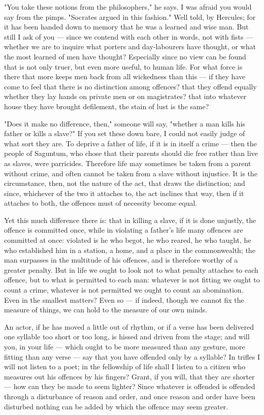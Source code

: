  "You take these notions from the philosophers," he says. I was afraid you would say from the pimps. "Socrates argued in this fashion." Well told, by Hercules; for it has been handed down to memory that he was a learned and wise man. But still I ask of you — since we contend with each other in words, not with fists — whether we are to inquire what porters and day-labourers have thought, or what the most learned of men have thought? Especially since no view can be found that is not only truer, but even more useful, to human life. For what force is there that more keeps men back from all wickedness than this — if they have come to feel that there is no distinction among offences? that they offend equally whether they lay hands on private men or on magistrates? that into whatever house they have brought defilement, the stain of lust is the same?

 "Does it make no difference, then," someone will say, "whether a man kills his father or kills a slave?" If you set these down bare, I could not easily judge of what sort they are. To deprive a father of life, if it is in itself a crime — then the people of Saguntum, who chose that their parents should die free rather than live as slaves, were parricides. Therefore life may sometimes be taken from a parent without crime, and often cannot be taken from a slave without injustice. It is the circumstance, then, not the nature of the act, that draws the distinction; and since, whichever of the two it attaches to, the act inclines that way, then if it attaches to both, the offences must of necessity become equal.

 Yet this much difference there is: that in killing a slave, if it is done unjustly, the offence is committed once, while in violating a father's life many offences are committed at once: violated is he who begot, he who reared, he who taught, he who established him in a station, a home, and a place in the commonwealth; the man surpasses in the multitude of his offences, and is therefore worthy of a greater penalty. But in life we ought to look not to what penalty attaches to each offence, but to what is permitted to each man: whatever is not fitting we ought to count a crime, whatever is not permitted we ought to count an abomination. Even in the smallest matters? Even so — if indeed, though we cannot fix the measure of things, we can hold to the measure of our own minds.

 An actor, if he has moved a little out of rhythm, or if a verse has been delivered one syllable too short or too long, is hissed and driven from the stage; and will you, in your life — which ought to be more measured than any gesture, more fitting than any verse — say that you have offended only by a syllable? In trifles I will not listen to a poet; in the fellowship of life shall I listen to a citizen who measures out his offences by his fingers? Grant, if you will, that they are shorter — how can they be made to seem lighter? Since whatever is offended is offended through a disturbance of reason and order, and once reason and order have been disturbed nothing can be added by which the offence may seem greater.

